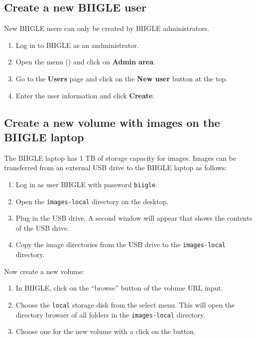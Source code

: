\subsection*{Create a new BIIGLE user}

New BIIGLE users can only be created by BIIGLE administrators.

\begin{enumerate}
	\item Log in to BIIGLE as an andministrator.
	\item Open the menu () and click on \textbf{Admin area}.
	\item Go to the \textbf{Users} page and click on the \textbf{New user} button at the top.
	\item Enter the user information and click \textbf{Create}.
\end{enumerate}

\subsection*{Create a new volume with images on the BIIGLE laptop}

The BIIGLE laptop has 1 TB of storage capacity for images. Images can be transferred from an external USB drive to the BIIGLE laptop as follows:

\begin{enumerate}
	\item Log in as user BIIGLE with password \texttt{biigle}.
	\item Open the \texttt{images-local} directory on the desktop.
	\item Plug in the USB drive. A second window will appear that shows the contents of the USB drive.
	\item Copy the image directories from the USB drive to the \texttt{images-local} directory.
\end{enumerate}

Now create a new volume:

\begin{enumerate}
	\item In BIIGLE, click on the ``browse'' button of the volume URL input.
	\item Choose the \texttt{local} storage disk from the select menu. This will open the directory browser of all folders in the \texttt{images-local} directory.
	\item Choose one for the new volume with a click on the  button.
\end{enumerate}

